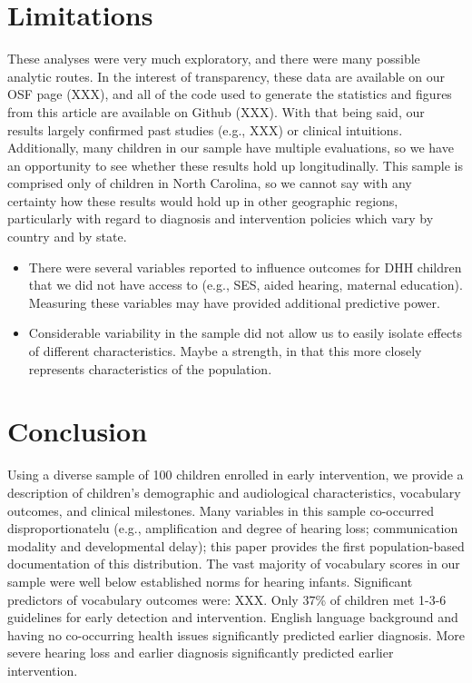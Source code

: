 \documentclass[english,man]{apa6}
\begin{document}
\hypertarget{limitations}{%
\section{Limitations}\label{limitations}}

These analyses were very much exploratory, and there were many possible analytic routes. In the interest of transparency, these data are available on our OSF page (XXX), and all of the code used to generate the statistics and figures from this article are available on Github (XXX). With that being said, our results largely confirmed past studies (e.g., XXX) or clinical intuitions. Additionally, many children in our sample have multiple evaluations, so we have an opportunity to see whether these results hold up longitudinally.
This sample is comprised only of children in North Carolina, so we cannot say with any certainty how these results would hold up in other geographic regions, particularly with regard to diagnosis and intervention policies which vary by country and by state.

\begin{itemize}
\item
  There were several variables reported to influence outcomes for DHH children that we did not have access to (e.g., SES, aided hearing, maternal education). Measuring these variables may have provided additional predictive power.
\item
  Considerable variability in the sample did not allow us to easily isolate effects of different characteristics. Maybe a strength, in that this more closely represents characteristics of the population.
\end{itemize}

\hypertarget{conclusion}{%
\section{Conclusion}\label{conclusion}}

Using a diverse sample of 100 children enrolled in early intervention, we provide a description of children's demographic and audiological characteristics, vocabulary outcomes, and clinical milestones. Many variables in this sample co-occurred disproportionatelu (e.g., amplification and degree of hearing loss; communication modality and developmental delay); this paper provides the first population-based documentation of this distribution. The vast majority of vocabulary scores in our sample were well below established norms for hearing infants. Significant predictors of vocabulary outcomes were: XXX. Only 37\% of children met 1-3-6 guidelines for early detection and intervention. English language background and having no co-occurring health issues significantly predicted earlier diagnosis. More severe hearing loss and earlier diagnosis significantly predicted earlier intervention.
\end{document}
